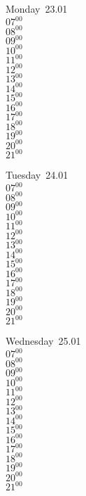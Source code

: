 \documentclass[11pt,a4paper]{book}\usepackage[]{graphicx}\usepackage[]{color}
\begin{document}
\begin{headerbox}
\end{headerbox}
\begin{weekdaybox}
  Monday~23.01\\
  { 
  \vfill
  $07^{00}$\\
$08^{00}$\\
$09^{00}$\\
$10^{00}$\\
$11^{00}$\\
$12^{00}$\\
$13^{00}$\\
$14^{00}$\\
$15^{00}$\\
$16^{00}$\\
$17^{00}$\\
$18^{00}$\\
$19^{00}$\\
$20^{00}$\\
$21^{00}$\\
  }
\end{weekdaybox}
\begin{weekdaybox}
  Tuesday~24.01\\
  { 
  \vfill
  $07^{00}$\\
$08^{00}$\\
$09^{00}$\\
$10^{00}$\\
$11^{00}$\\
$12^{00}$\\
$13^{00}$\\
$14^{00}$\\
$15^{00}$\\
$16^{00}$\\
$17^{00}$\\
$18^{00}$\\
$19^{00}$\\
$20^{00}$\\
$21^{00}$\\
  }
\end{weekdaybox}
\begin{weekdaybox}
  Wednesday~25.01\\
  { 
  \vfill
  $07^{00}$\\
$08^{00}$\\
$09^{00}$\\
$10^{00}$\\
$11^{00}$\\
$12^{00}$\\
$13^{00}$\\
$14^{00}$\\
$15^{00}$\\
$16^{00}$\\
$17^{00}$\\
$18^{00}$\\
$19^{00}$\\
$20^{00}$\\
$21^{00}$\\
  }
\end{weekdaybox}
\end{document}
